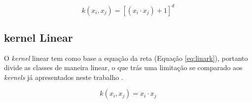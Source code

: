 \begin{equation}
  k( x_{i},  x_{j}) = [(x_{i} \cdot x_{j}) + 1]^d
  \label{eq:polinK}
\end{equation}


\subsection{kernel Linear}
O \textit{kernel} linear tem como base a equação da reta (Equação \ref{eq:linark}), portanto divide as classes de maneira linear, o que trás uma
limitação se comparado aos \textit{kernels} já apresentados neste trabalho \cite{Almeida_Carvalho_Menino_2020}.


\begin{equation}
  k( x_{i},  x_{j}) = x_{i} \cdot x_{j}
  \label{eq:linark}
\end{equation}
